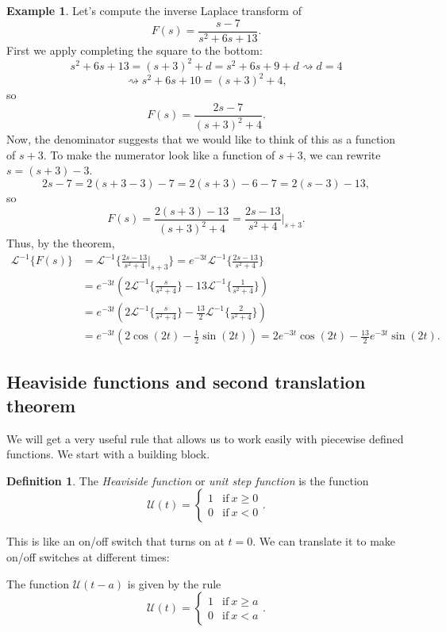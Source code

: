\documentclass[12pt]{amsart}
\numberwithin{equation}{section}
\theoremstyle{plain} %
\newcommand{\rsa}{\rightsquigarrow}
\theoremstyle{definition}
\newtheorem{defn}[equation]{Definition}
\newtheorem{ex}[equation]{Example}
\theoremstyle{remark}
\newcommand{\LAi}[1]{\mathcal{L}^{-1}\{ #1 \}}
\newcommand{\U}{\mathcal{U}}
\begin{document}
\begin{ex}
Let's compute the inverse Laplace transform of
\[ F(s) = \frac{s - 7} {s^2 + 6s + 13}.\]
First we apply completing the square to the bottom:
\[ s^2 + 6s + 13 = (s+3)^2 + d = s^2 + 6s + 9 + d \rsa d=4\]
\[ \rsa s^2 + 6s + 10 = (s+3)^2 + 4,\]
so 
\[ F(s) = \frac{2s - 7} {(s+3)^2 + 4}.\]
Now, the denominator suggests that we would like to think of this as a function of $s+3$. To make the numerator look like a function of $s+3$, we can rewrite $s= (s+3) -3$.
\[ 2s-7 = 2(s+3 - 3) - 7 = 2(s+3) - 6 - 7 = 2(s-3)-13,\]
so
\[ F(s) =  \frac{2(s+3)-13} {(s+3)^2 + 4} = \frac{2s-13}{s^2+4} |_{s+3}.\]
Thus, by the theorem,
\[ \begin{aligned}
\LAi{F(s)} &= \LAi{\frac{2s-13}{s^2+4} |_{s+3}} =  e^{-3t} \LAi{\frac{2s-13}{s^2+4}} \\&=
e^{-3t}\left( 2\LAi{\frac{s}{s^2+4}} - 13\LAi{\frac{1}{s^2+4}}\right) 
\\ &= e^{-3t}\left( 2\LAi{\frac{s}{s^2+4}} - \frac{13}{2}\LAi{\frac{2}{s^2+4}}\right) \\&=e^{-3t} (2 \cos(2t) - \frac{1}{2} \sin(2t))
 = 2 e^{-3t} \cos(2t) - \frac{13}{2}e^{-3t} \sin(2t).\end{aligned}\]
\end{ex}

\subsection*{Heaviside functions and second translation theorem}

We will get a very useful rule that allows us to work easily with piecewise defined functions. We start with a building block.

\begin{defn} The \emph{Heaviside function} or \emph{unit step function} is the function
\[ \U(t) = \begin{cases} 1 &\text{if} \ x\geq 0 \\ 0 &\text{if} \ x < 0 \end{cases}.\]
\end{defn}

This is like an on/off switch that turns on at $t=0$. We can translate it to make on/off switches at different times:

The function $\U(t-a)$ is given by the rule
\[ \U(t) = \begin{cases} 1 &\text{if} \ x\geq a \\ 0 &\text{if} \ x < a \end{cases}.\]
\end{document}
